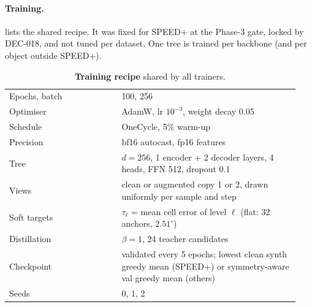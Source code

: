 \paragraph{Training.}
 lists the shared recipe. It was fixed for SPEED+ at the Phase-3 gate, locked by DEC-018, and not tuned per dataset. One tree is trained per backbone (and per object outside SPEED+).

\begin{table}[t]
  \centering\footnotesize
  \setlength{\tabcolsep}{3pt}
  \caption{\textbf{Training recipe} shared by all trainers.}
  \label{app:z_tab_train}
  \begin{tabular}{@{}p{0.36\linewidth}p{0.58\linewidth}@{}}
    \toprule
    \raggedright Epochs, batch & \raggedright 100, 256\tabularnewline
    \raggedright Optimiser & \raggedright AdamW, lr $10^{-3}$, weight decay 0.05\tabularnewline
    \raggedright Schedule & \raggedright OneCycle, 5\% warm-up\tabularnewline
    \raggedright Precision & \raggedright bf16 autocast, fp16 features\tabularnewline
    \raggedright Tree & \raggedright $d=256$, 1 encoder + 2 decoder layers, 4 heads, FFN 512, dropout 0.1\tabularnewline
    \raggedright Views & \raggedright clean or augmented copy 1 or 2, drawn uniformly per sample and step\tabularnewline
    \raggedright Soft targets & \raggedright $\tau_\ell$ = mean cell error of level $\ell$ (flat: 32 anchors, $2.51^\circ$)\tabularnewline
    \raggedright Distillation & \raggedright $\beta=1$, 24 teacher candidates\tabularnewline
    \raggedright Checkpoint & \raggedright validated every 5 epochs; lowest clean synth greedy mean (SPEED+) or symmetry-aware val greedy mean (others)\tabularnewline
    \raggedright Seeds & \raggedright 0, 1, 2\tabularnewline
    \bottomrule
  \end{tabular}
\end{table}

